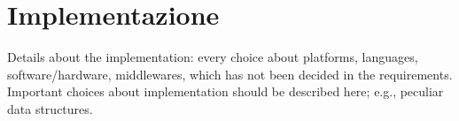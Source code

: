 
\chapter{Implementazione}

Details about the implementation: every choice about platforms, languages, software/hardware, middlewares, which has not been decided in the requirements.
Important choices about implementation should be described here; e.g., peculiar data structures.